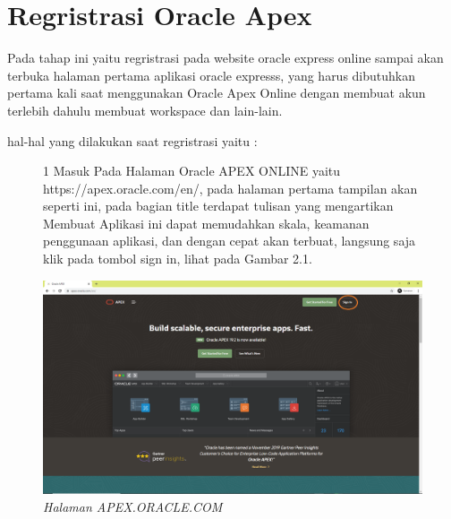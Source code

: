 \section{Regristrasi Oracle Apex}

Pada tahap ini yaitu regristrasi pada website oracle express online sampai akan terbuka halaman pertama aplikasi oracle expresss, yang harus dibutuhkan pertama kali saat menggunakan Oracle Apex Online dengan membuat akun terlebih dahulu membuat workspace dan lain-lain.

hal-hal yang dilakukan saat regristrasi yaitu :

\begin{itemize}
        
        \begin{figure}[!htbp]
        \item[1]Masuk Pada Halaman Oracle APEX ONLINE yaitu https://apex.oracle.com/en/, pada halaman pertama tampilan akan seperti ini, pada bagian title terdapat tulisan yang mengartikan Membuat Aplikasi ini dapat memudahkan skala, keamanan penggunaan aplikasi, dan dengan cepat akan terbuat, langsung saja klik pada tombol sign in, lihat pada Gambar 2.1.
        \begin{center}
        \includegraphics[scale=0.23]{figures/1.png}
        \caption{\textit{Halaman APEX.ORACLE.COM}}
        \end{center}
        \end{figure}
        

\end{itemize}
